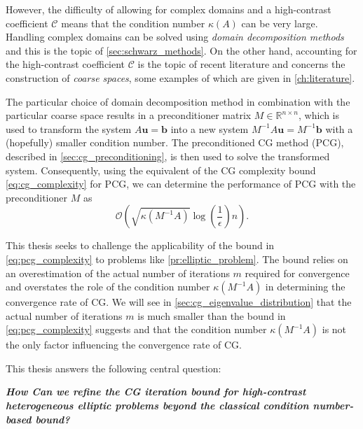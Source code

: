 However, the difficulty of allowing for complex domains and a high-contrast coefficient $\mathcal{C}$ means that the condition number $\kappa(A)$ can be very large. Handling complex domains can be solved using \textit{domain decomposition methods} and this is the topic of \cref{sec:schwarz_methods}. On the other hand, accounting for the high-contrast coefficient $\mathcal{C}$ is the topic of recent literature and concerns the construction of \textit{coarse spaces}, some examples of which are given in \cref{ch:literature}.

The particular choice of domain decomposition method in combination with the particular coarse space results in a preconditioner matrix $M\in\mathbb{R}^{n \times n}$, which is used to transform the system $A\mathbf{u} = \mathbf{b}$ into a new system $M^{-1}A\mathbf{u} = M^{-1}\mathbf{b}$ with a (hopefully) smaller condition number. The preconditioned CG method (PCG), described in \cref{sec:cg_preconditioning}, is then used to solve the transformed system. Consequently, using the equivalent of the CG complexity bound \cref{eq:cg_complexity} for PCG, we can determine the performance of PCG with the preconditioner $M$ as
\begin{equation}
  \mathcal{O}\left(\sqrt{\kappa(M^{-1}A)}\log\left(\frac{1}{\epsilon}\right)n\right).
  \label{eq:pcg_complexity}
\end{equation}

This thesis seeks to challenge the applicability of the bound in \cref{eq:pcg_complexity} to problems like \cref{pr:elliptic_problem}. The bound relies on an overestimation of the actual number of iterations $m$ required for convergence and overstates the role of the condition number $\kappa(M^{-1}A)$ in determining the convergence rate of CG. We will see in \cref{sec:cg_eigenvalue_distribution} that the actual number of iterations $m$ is much smaller than the bound in \cref{eq:pcg_complexity} suggests and that the condition number $\kappa(M^{-1}A)$ is not the only factor influencing the convergence rate of CG. 

This thesis answers the following central question:
\vspace{0.5em}
\begin{center}
\textit{\textbf{How Can we refine the CG iteration bound for high-contrast heterogeneous elliptic problems beyond the classical condition number-based bound?}}
\end{center}
\vspace{0.5em}

